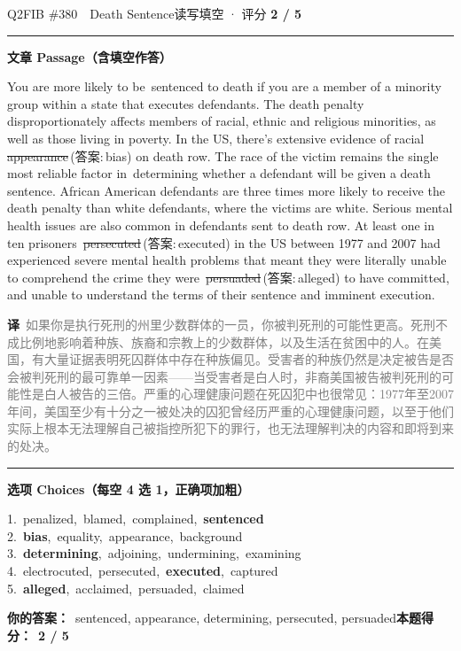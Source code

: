 \documentclass[11pt]{article}
\newcommand{\ptesub}[1]{%
  \par\needspace{2\baselineskip}\smallskip
  {\color{cAccent}\rule[-0.2ex]{3pt}{1.05em}}\hspace{6pt}%
  {\bfseries\color{cHead}#1}\par\nopagebreak\smallskip}
\newcommand{\zh}[1]{{\footnotesize\textcolor{cNote}{\textbf{译}}\ \textcolor{gray}{#1}}}
\newcommand{\rok}[1]{{\color{cFix}\ding{51}\,#1}}                 %
\newcommand{\rno}[2]{{\color{cWrong}\ding{55}\,\sout{#1}}\,{\footnotesize\color{cFix}(答案:\,#2)}}  %
\begin{document}
\begin{qblock}{Q2\quad FIB \#380\ \ Death Sentence}{读写填空 · 评分 \textcolor{cAccent}{\bfseries 2 / 5}}
\ptesub{文章 Passage（含填空作答）}
\begin{promptbox}
You are more likely to be \rok{sentenced} to death if you are a member of a minority group within a state that executes defendants. The death penalty disproportionately affects members of racial, ethnic and religious minorities, as well as those living in poverty. In the US, there's extensive evidence of racial \rno{appearance}{bias} on death row. The race of the victim remains the single most reliable factor in \rok{determining} whether a defendant will be given a death sentence. African American defendants are three times more likely to receive the death penalty than white defendants, where the victims are white. Serious mental health issues are also common in defendants sent to death row. At least one in ten prisoners \rno{persecuted}{executed} in the US between 1977 and 2007 had experienced severe mental health problems that meant they were literally unable to comprehend the crime they were \rno{persuaded}{alleged} to have committed, and unable to understand the terms of their sentence and imminent execution.
\end{promptbox}
\zh{如果你是执行死刑的州里少数群体的一员，你被判死刑的可能性更高。死刑不成比例地影响着种族、族裔和宗教上的少数群体，以及生活在贫困中的人。在美国，有大量证据表明死囚群体中存在种族偏见。受害者的种族仍然是决定被告是否会被判死刑的最可靠单一因素——当受害者是白人时，非裔美国被告被判死刑的可能性是白人被告的三倍。严重的心理健康问题在死囚犯中也很常见：1977年至2007年间，美国至少有十分之一被处决的囚犯曾经历严重的心理健康问题，以至于他们实际上根本无法理解自己被指控所犯下的罪行，也无法理解判决的内容和即将到来的处决。}
\ptesub{选项 Choices（每空 4 选 1，正确项加粗）}
{\small
1.\ penalized,\ blamed,\ complained,\ \textbf{sentenced}\\
2.\ \textbf{bias},\ equality,\ appearance,\ background\\
3.\ \textbf{determining},\ adjoining,\ undermining,\ examining\\
4.\ electrocuted,\ persecuted,\ \textbf{executed},\ captured\\
5.\ \textbf{alleged},\ acclaimed,\ persuaded,\ claimed}
\par\smallskip
\textbf{你的答案：}\ sentenced, {\color{cWrong}appearance}, determining, {\color{cWrong}persecuted, persuaded}\qquad\textbf{本题得分：}\ {\color{cAccent}\bfseries 2 / 5}
\end{qblock}
\end{document}
